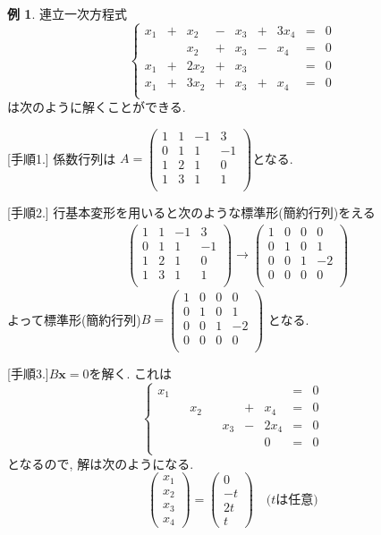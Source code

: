 \documentclass[dvipdfmx,a4paper,11pt]{article}
\theoremstyle{definition}
\newtheorem{exa}[thm]{例}
\begin{document}
 \begin{exa}\cite[例題2.4]{M}
 \label{exa-2.4}
連立一次方程式
 $$
 \left\{ 
\begin{matrix}
x_1& + &  x_2&  -& x_3&+&3x_4& = & 0 \\
          &  & x_2&  +& x_3& -&x_4& = & 0 \\
 x_1& + & 2x_2&  +& x_3&  && = & 0 \\
  x_1& + & 3x_2&  +& x_3&  +&x_4& = & 0 \\
\end{matrix}
\right.
 $$
 は次のように解くことができる.
 
 [手順1.] 係数行列は
$A=
\begin{pmatrix}
1 & 1&-1&3\\
0 & 1&1&-1\\
1 & 2&1&0\\
1 & 3&1&1\\
 \end{pmatrix}
 $となる.
 
 [手順2.] 行基本変形を用いると次のような標準形(簡約行列)をえる
 \begin{align*}
 &\begin{pmatrix}
1 & 1&-1&3\\
0 & 1&1&-1\\
1 & 2&1&0\\
1 & 3&1&1\\
 \end{pmatrix}
 \overset{}{\longrightarrow} 
\begin{pmatrix}
1 & 0&0&0\\
0 & 1&0&1\\
0 & 0&1&-2\\
0& 0&0&0\\
 \end{pmatrix}
 \end{align*}
 よって標準形(簡約行列)$B= \begin{pmatrix}
1 & 0&0&0\\
0 & 1&0&1\\
0 & 0&1&-2\\
0& 0&0&0\\
 \end{pmatrix}$
 となる.
 
 [手順3.]$B\bm{x}=0$を解く. 
 これは 
 $$
 \left\{ 
\begin{matrix}
x_1&  &  &  && &&    = & 0 \\
&  &x_2 &  & &+&x_4&  = & 0 \\
&  & &  & x_3&-&2x_4&    = & 0 \\
&  & &  &  & & 0&    = & 0 \\
\end{matrix}
\right.
 $$
 となるので, 解は次のようになる.
 $$
 \begin{pmatrix}
 x_1\\x_2\\x_3\\x_4
 \end{pmatrix}
=
 \begin{pmatrix}
 0\\-t\\2t\\t
 \end{pmatrix}
 \quad
 \text{($t$は任意)}
 $$
 \end{exa}
\end{document}
